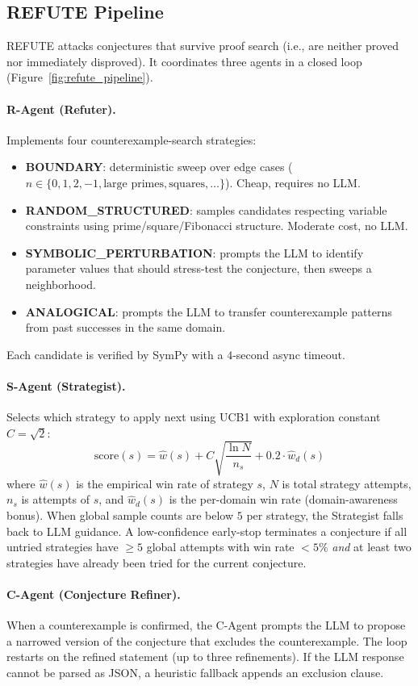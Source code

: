 \subsection{REFUTE Pipeline}



REFUTE attacks conjectures that survive proof search (i.e., are neither proved
nor immediately disproved).
It coordinates three agents in a closed loop (Figure~\ref{fig:refute_pipeline}).

\paragraph{R-Agent (Refuter).}
Implements four counterexample-search strategies:
\begin{itemize}[noitemsep]
  \item \textbf{BOUNDARY}: deterministic sweep over edge cases
    ($n \in \{0, 1, 2, -1, \text{large primes}, \text{squares}, \ldots\}$).
    Cheap, requires no LLM.
  \item \textbf{RANDOM\_STRUCTURED}: samples candidates respecting variable
    constraints using prime/square/Fibonacci structure.
    Moderate cost, no LLM.
  \item \textbf{SYMBOLIC\_PERTURBATION}: prompts the LLM to identify parameter
    values that should stress-test the conjecture, then sweeps a neighborhood.
  \item \textbf{ANALOGICAL}: prompts the LLM to transfer counterexample
    patterns from past successes in the same domain.
\end{itemize}
Each candidate is verified by SymPy with a $4$-second async timeout.

\paragraph{S-Agent (Strategist).}
Selects which strategy to apply next using UCB1 with exploration constant
$C = \sqrt{2}$:
\[
  \text{score}(s) = \hat{w}(s) + C\sqrt{\frac{\ln N}{n_s}} + 0.2 \cdot \hat{w}_d(s)
\]
where $\hat{w}(s)$ is the empirical win rate of strategy $s$, $N$ is total
strategy attempts, $n_s$ is attempts of $s$, and $\hat{w}_d(s)$ is the
per-domain win rate (domain-awareness bonus).
When global sample counts are below $5$ per strategy, the Strategist falls
back to LLM guidance.
A low-confidence early-stop terminates a conjecture if all untried strategies
have $\geq 5$ global attempts with win rate $< 5\%$
\emph{and} at least two strategies have already been tried for the current
conjecture.

\paragraph{C-Agent (Conjecture Refiner).}
When a counterexample is confirmed, the C-Agent prompts the LLM to propose a
narrowed version of the conjecture that excludes the counterexample.
The loop restarts on the refined statement (up to three refinements).
If the LLM response cannot be parsed as JSON, a heuristic fallback appends an
exclusion clause.
